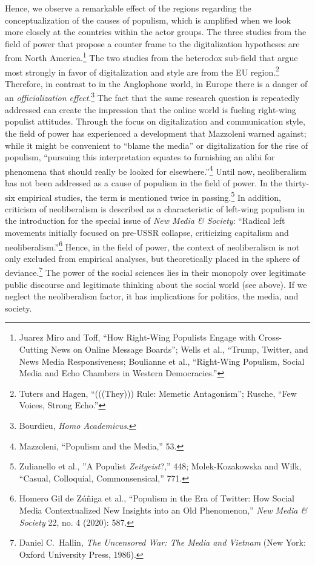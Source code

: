 \documentclass{tufte-handout}
\begin{document}
{{Hence, we observe a remarkable effect of the regions regarding the
conceptualization of the causes of populism, which is amplified when we
look more closely at the countries within the actor groups. The three
studies from the field of power that propose a counter frame to the
digitalization hypotheses are from North America.\footnote{Juarez Miro
  and Toff, ``How Right-Wing Populists Engage with Cross-Cutting News on
  Online Message Boards''; Wells et al., ``Trump, Twitter, and News
  Media Responsiveness; Boulianne et al., ``Right-Wing Populism, Social
  Media and Echo Chambers in Western Democracies.''} The two studies
from the heterodox sub-field that argue most strongly in favor of
digitalization and style are from the EU region.\footnote{Tuters and
  Hagen, ``(((They))) Rule: Memetic Antagonism''; Rusche, ``Few Voices,
  Strong Echo.''} Therefore, in contrast to in the Anglophone world, in
Europe there is a danger of an \emph{officialization effect}.\footnote{Bourdieu,
  \emph{Homo Academicus}.} The fact that the same research question is
repeatedly addressed can create the impression that the online world is
fueling right-wing populist attitudes. Through the focus on
digitalization and communication style, the field of power has
experienced a development that Mazzoleni warned against; while it might
be convenient to ``blame the media'' or digitalization for the rise of
populism, ``pursuing this interpretation equates to furnishing an alibi
for phenomena that should really be looked for elsewhere.''\footnote{Mazzoleni,
  ``Populism and the Media,'' 53.} Until now, neoliberalism has not been
addressed as a cause of populism in the field of power. In the
thirty-six empirical studies, the term is mentioned twice in
passing.\footnote{Zulianello et al., ''A Populist \emph{Zeitgeist}?,''
  448; Molek-Kozakowska and Wilk, ``Casual, Colloquial,
  Commonsensical,'' 771.} In addition, criticism of neoliberalism is
described as a characteristic of left-wing populism in the introduction
for the special issue of \emph{New Media \& Society}: ``Radical left
movements initially focused on pre-USSR collapse, criticizing capitalism
and neoliberalism.''\footnote{Homero Gil de Zúñiga et al., ``Populism in
  the Era of Twitter: How Social Media Contextualized New Insights into
  an Old Phenomenon,'' \emph{New Media \& Society} 22, no. 4 (2020):
  587.} Hence, in the field of power, the context of neoliberalism is
not only excluded from empirical analyses, but theoretically placed in
the sphere of deviance.\footnote{Daniel C.~Hallin, \emph{The Uncensored
  War: The Media and Vietnam} (New York: Oxford University Press, 1986).}
The power of the social sciences lies in their monopoly over legitimate
public discourse and legitimate thinking about the social world (see
above). If we neglect the neoliberalism factor, it has implications for
politics, the media, and society.

}}
\end{document}
